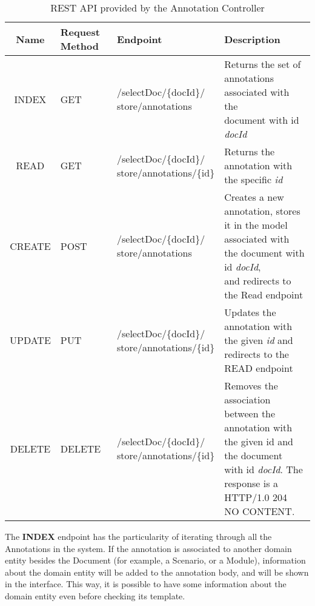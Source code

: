 \begin{table}[h]
\begin{tabular}{ | c | m{1.5cm} | m{3.5cm} |m{7.7cm}|}
    \hline
    \textbf{Name} & \textbf{Request} \textbf{Method }& \textbf{Endpoint} & \textbf{Description}\\ \hline
	INDEX & GET & \parbox[c][1.5cm]{3.5cm}{/selectDoc/\{docId\}/\\store/annotations} & \parbox[c]{8cm}{Returns the set of annotations associated with the \\document with id \textit{docId} }\\ \hline
   	READ & GET & \parbox[c][1.5cm]{3.5cm}{/selectDoc/\{docId\}/\\store/annotations/\{id\}} & Returns the annotation with the specific \textit{id} \\ \hline
    CREATE & POST & \parbox[c]{3.5cm}{/selectDoc/\{docId\}/\\store/annotations} & \parbox[c][1.5cm]{8cm}{Creates a new annotation, stores it in the model \\associated with the document with id \textit{docId}, \\ and redirects to the Read endpoint} \\ \hline
    UPDATE & PUT & \parbox[c][1.5cm]{3.5cm}{/selectDoc/\{docId\}/\\store/annotations/\{id\}} & \parbox[c]{8cm}{Updates the annotation with the given \textit{id} and \\redirects to the READ endpoint} \\ \hline
    DELETE & DELETE & \parbox[t]{3.5cm}{/selectDoc/\{docId\}/\\store/annotations/\{id\}} & \parbox[c][2cm]{8cm}{Removes the association between the \\ annotation with the given id and the document \\ with id \textit{docId}. The response is a HTTP/1.0 204 \\ NO CONTENT.} \\ \hline
  \end{tabular}
  \caption{REST API provided by the Annotation Controller}
  \label{table:endpoints}
\end{table}

The \textbf{INDEX} endpoint has the particularity of iterating through all the Annotations in the system. If the annotation is associated to another domain entity besides the Document (for example, a Scenario, or a Module), information about the domain entity will be added to the annotation body, and will be shown in the interface. This way, it is possible to have some information about the domain entity even before checking its template. 

